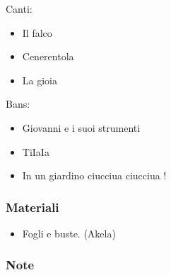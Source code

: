 \documentclass[../main.tex]{subfiles}
\begin{document}
        Canti:
        \begin{itemize}
            \item Il falco
            \item Cenerentola
            \item La gioia
        \end{itemize}

        Bans:
        \begin{itemize}
            \item Giovanni e i suoi strumenti
            \item TiIaIa
            \item In un giardino ciucciua ciucciua ! 
        \end{itemize}

        \subsubsection{Materiali}
        \begin{itemize}
            \item Fogli e buste. (Akela)
        \end{itemize}
        \subsubsection{Note}
   
\end{document}
